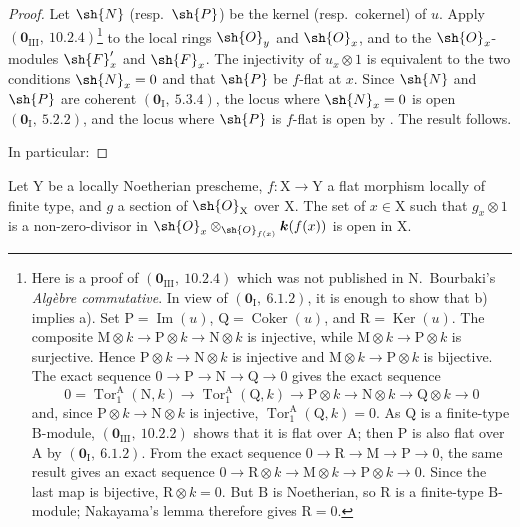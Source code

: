 \begin{proof}
Let $\sh{N}$ (resp.\ $\sh{P}$) be the kernel (resp.\ cokernel) of $u$.
Apply $(\mathbf{0}_{\mathrm{III}},~10.2.4)$\footnote{Here is a proof of
$(\mathbf{0}_{\mathrm{III}},~10.2.4)$ which was not published in
N.~Bourbaki's \emph{Alg\`ebre commutative}. In view of
$(\mathbf{0}_\mathrm{I},~6.1.2)$, it is enough to show that b) implies a).
Set $\mathrm{P}=\operatorname{Im}(u)$,
$\mathrm{Q}=\operatorname{Coker}(u)$, and
$\mathrm{R}=\operatorname{Ker}(u)$. The composite
$\mathrm{M}\otimes k\to\mathrm{P}\otimes k\to\mathrm{N}\otimes k$ is
injective, while $\mathrm{M}\otimes k\to\mathrm{P}\otimes k$ is
surjective. Hence $\mathrm{P}\otimes k\to\mathrm{N}\otimes k$ is
injective and $\mathrm{M}\otimes k\to\mathrm{P}\otimes k$ is bijective.
The exact sequence $0\to\mathrm{P}\to\mathrm{N}\to\mathrm{Q}\to0$ gives
the exact sequence
\[
0=\operatorname{Tor}_1^\mathrm{A}(\mathrm{N},k)\to\operatorname{Tor}_1^\mathrm{A}(\mathrm{Q},k)\to\mathrm{P}\otimes k\to\mathrm{N}\otimes k\to\mathrm{Q}\otimes k\to 0
\]
and, since $\mathrm{P}\otimes k\to\mathrm{N}\otimes k$ is injective,
$\operatorname{Tor}_1^\mathrm{A}(\mathrm{Q},k)=0$. As $\mathrm{Q}$ is a
finite-type $\mathrm{B}$-module,
$(\mathbf{0}_{\mathrm{III}},~10.2.2)$ shows that it is flat over
$\mathrm{A}$; then $\mathrm{P}$ is also flat over $\mathrm{A}$ by
$(\mathbf{0}_\mathrm{I},~6.1.2)$. From the exact sequence
$0\to\mathrm{R}\to\mathrm{M}\to\mathrm{P}\to0$, the same result gives an
exact sequence
$0\to\mathrm{R}\otimes k\to\mathrm{M}\otimes k\to
\mathrm{P}\otimes k\to0$. Since the last map is bijective,
$\mathrm{R}\otimes k=0$. But $\mathrm{B}$ is Noetherian, so
$\mathrm{R}$ is a finite-type $\mathrm{B}$-module; Nakayama's lemma
therefore gives $\mathrm{R}=0$.}
to the local rings $\sh{O}_y$ and $\sh{O}_x$, and to the
$\sh{O}_x$-modules $\sh{F}'_x$ and $\sh{F}_x$. The injectivity of
$u_x\otimes1$ is equivalent to the two conditions
$\sh{N}_x=0$ and that $\sh{P}$ be $f$-flat at $x$. Since
$\sh{N}$ and $\sh{P}$ are coherent $(\mathbf{0}_\mathrm{I},~5.3.4)$,
the locus where $\sh{N}_x=0$ is open
$(\mathbf{0}_\mathrm{I},~5.2.2)$, and the locus where $\sh{P}$ is
$f$-flat is open by . The result follows.

In particular:
\end{proof}

\begin{corollary}[11.1.3]
\label{IV.11.1.3}
Let $\mathrm{Y}$ be a locally Noetherian prescheme,
$f:\mathrm{X}\to\mathrm{Y}$ a flat morphism locally of finite type, and
$g$ a section of $\sh{O}_\mathrm{X}$ over $\mathrm{X}$. The set of
$x\in\mathrm{X}$ such that $g_x\otimes 1$ is a non-zero-divisor in
$\sh{O}_x\otimes_{\sh{O}_{f(x)}}\boldsymbol{k}(f(x))$ is open in
$\mathrm{X}$.
\end{corollary}


